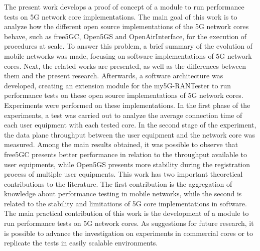 The present work develops a proof of concept of a module to run performance tests on 5G network core implementations.
The main goal of this work is to analyze how the different open source implementations of the 5G network cores behave, such as free5GC, Open5GS and OpenAirInterface, for the execution of procedures at scale.
To answer this problem, a brief summary of the evolution of mobile networks was made, focusing on software implementations of 5G network cores.
Next, the related works are presented, as well as the differences between them and the present research.
Afterwards, a software architecture was developed, creating an extension module for the my5G-RANTester to run performance tests on these open source implementations of 5G network cores.
Experiments were performed on these implementations.
In the first phase of the experiments, a test was carried out to analyze the average connection time of each user equipment with each tested core. In the second stage of the experiment, the data plane throughput between the user equipment and the network core was measured.
Among the main results obtained, it was possible to observe that free5GC presents better performance in relation to the throughput available to user equipments, while Open5GS presents more stability during the registration process of multiple user equipments.
This work has two important theoretical contributions to the literature. The first contribution is the aggregation of knowledge about performance testing in mobile networks, while the second is related to the stability and limitations of 5G core implementations in software.
The main practical contribution of this work is the development of a module to run performance tests on 5G network cores.
As suggestions for future research, it is possible to advance the investigation on experiments in commercial cores or to replicate the tests in easily scalable environments.